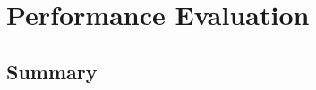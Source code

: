 \chapter{Performance Evaluation}

    \graphicspath{{Chapter6-PerformanceEvaluation/Figs/Vector/}{Chapter6-PerformanceEvaluation/Figs/}}


\section{Summary}